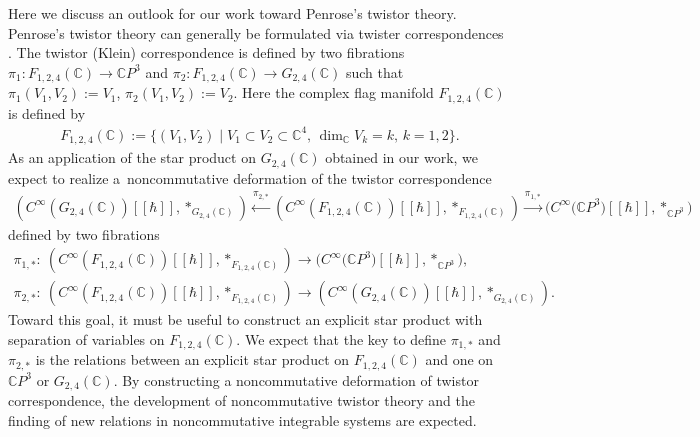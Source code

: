 \documentclass[10pt,a4paper]{amsart}
\numberwithin{equation}{section}
\begin{document}
Here we discuss an outlook for our work toward Penrose's twistor theory.
Penrose's twistor theory can generally be formulated via twister correspondences \cite{Pen1,Pen2,Pen3,Ward1,WaWe}.
The twistor (Klein) correspondence  is defined by two fibrations
$
\pi_{1}
\colon
F_{1,2,4}(\mathbb{C})\allowbreak
\to
\mathbb{C}P^{3}
$
and
$
\pi_{2}
\colon
F_{1,2,4}(\mathbb{C})
\to
G_{2,4}(\mathbb{C})
$
such that $\pi_{1}(V_{1},V_{2}):=V_{1}$, $\pi_{2}(V_{1},V_{2}):=V_{2}$. Here the complex flag manifold $F_{1,2,4}(\mathbb{C})$ is defined by
\begin{align*}
F_{1,2,4}(\mathbb{C})
:=
\bigl\{
(V_{1},V_{2})
\mid
V_{1}
\subset
V_{2}
\subset
\mathbb{C}^{4},\,
\dim\nolimits_{\mathbb{C}}
V_{k}
=
k,\,
k=1,2
\bigr\}.
\end{align*}
As an application of the star product on $G_{2,4}(\mathbb{C})$ obtained in our work, we expect to realize a~noncommutative deformation of the twistor correspondence
\begin{align*}
(C^{\infty}(G_{2,4}(\mathbb{C}))[\![\hbar]\!],\ast_{G_{2,4}(\mathbb{C})})
\xleftarrow{\pi_{2,\ast}}
(C^{\infty}(F_{1,2,4}(\mathbb{C}))[\![\hbar]\!],\ast_{F_{1,2,4}(\mathbb{C})})
\xrightarrow{\pi_{1,\ast}}
\bigl(C^{\infty}\bigl(\mathbb{C}P^{3}\bigr)[\![\hbar]\!],\ast_{\mathbb{C}P^{3}}\bigr)
\end{align*}
defined by two fibrations
\begin{gather*}
\pi_{1,\ast}\colon\
(C^{\infty}(F_{1,2,4}(\mathbb{C}))[\![\hbar]\!],\ast_{F_{1,2,4}(\mathbb{C})})
\to
\bigl(C^{\infty}\bigl(\mathbb{C}P^{3}\bigr)[\![\hbar]\!],\ast_{\mathbb{C}P^{3}}\bigr),
\\
\pi_{2,\ast}\colon\
(C^{\infty}(F_{1,2,4}(\mathbb{C}))[\![\hbar]\!],\ast_{F_{1,2,4}(\mathbb{C})})
\to
(C^{\infty}(G_{2,4}(\mathbb{C}))[\![\hbar]\!],\ast_{G_{2,4}(\mathbb{C})}).
\end{gather*}
Toward this goal, it must be useful to construct an explicit star product with separation of variables on $F_{1,2,4}(\mathbb{C})$.
We expect that the key to define $\pi_{1,\ast}$ and $\pi_{2,\ast}$ is the relations between an explicit star product on $F_{1,2,4}(\mathbb{C})$ and one on $\mathbb{C}P^{3}$ or $G_{2,4}(\mathbb{C})$.
By constructing a noncommutative deformation of twistor correspondence, the development of noncommutative twistor theory and the finding of new relations in noncommutative integrable systems are expected.


\appendix
\end{document}
